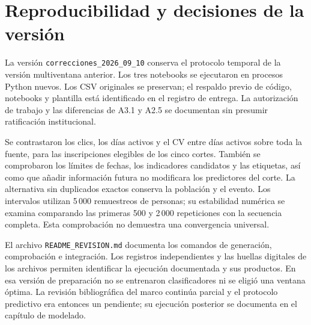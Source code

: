 \section{Reproducibilidad y decisiones de la versión}\label{anexo:reproducibilidad}
La versión \texttt{correcciones\_2026\_09\_10} conserva el protocolo temporal de la versión multiventana anterior. Los tres notebooks se ejecutaron en procesos Python nuevos. Los CSV originales se preservan; el respaldo previo de código, notebooks y plantilla está identificado en el registro de entrega. La autorización de trabajo y las diferencias de A3.1 y A2.5 se documentan sin presumir ratificación institucional.

Se contrastaron los clics, los días activos y el CV entre días activos sobre toda la fuente, para las inscripciones elegibles de los cinco cortes. También se comprobaron los límites de fechas, los indicadores candidatos y las etiquetas, así como que añadir información futura no modificara los predictores del corte. La alternativa sin duplicados exactos conserva la población y el evento. Los intervalos utilizan 5\,000 remuestreos de personas; su estabilidad numérica se examina comparando las primeras 500 y 2\,000 repeticiones con la secuencia completa. Esta comprobación no demuestra una convergencia universal.

El archivo \texttt{README\_\allowbreak{}REVISION.md} documenta los comandos de generación, comprobación e integración. Los registros independientes y las huellas digitales de los archivos permiten identificar la ejecución documentada y sus productos. En esa versión de preparación no se entrenaron clasificadores ni se eligió una ventana óptima. La revisión bibliográfica del marco continúa parcial y el protocolo predictivo era entonces un pendiente; su ejecución posterior se documenta en el capítulo de modelado.

